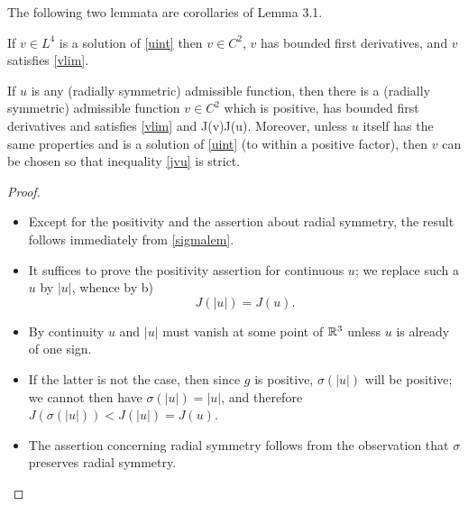 The following two lemmata are corollaries of Lemma 3.1.
\begin{lemma} 
    If $v\in L^4$ is a solution of \eqref{uint} then $v\in C^2$, $v$ has
    bounded first derivatives, and $v$ satisfies \eqref{vlim}.
\end{lemma}
\begin{lemma}\label{jineqlem}
    If $u$ is any (radially symmetric) admissible function, then there is a
    (radially symmetric) admissible function $v\in C^2$ which is positive, has
    bounded first derivatives and satisfies \eqref{vlim} and 
\be\label{jvu}
J(v)\leq J(u).
\ee
    Moreover, unless $u$ itself has the same properties and is a solution of 
    \eqref{uint} (to within a positive factor), then $v$ can be chosen so that
    inequality \eqref{jvu} is strict.
\end{lemma}
\begin{proof}
\begin{itemize}
    \item Except for the positivity and the assertion about radial symmetry, the
        result follows immediately from \cref{sigmalem}.
    \item It suffices to prove the positivity assertion for continuous $u$; we
        replace such a $u$ by $|u|$, whence by b) $$J(|u|)=J(u).$$
    \item By continuity $u$ and $|u|$ must vanish at some point of $\mathbb{R}^3$ unless
        $u$ is already of one sign.
    \item If the latter is not the case, then since $g$ is positive,
        $\sigma(|u|)$ will be positive; we cannot then have $\sigma(|u|)=|u|$,
        and therefore $J(\sigma(|u|))<J(|u|)=J(u)$.
    \item The assertion concerning radial symmetry follows from the observation
        that $\sigma$ preserves radial symmetry.
\end{itemize}
\end{proof}

% 
% 

